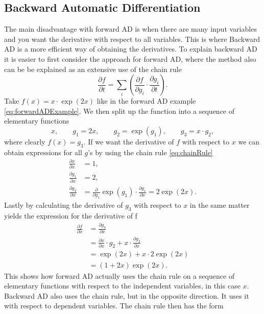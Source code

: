 \subsection{Backward Automatic Differentiation}
The main disadvantage with forward AD is when there are many input variables and you want the derivative with respect to all variables. This is where Backward AD is a more efficient way of obtaining the derivatives. To explain backward AD it is easier to first consider the approach for forward AD, where the method also can be be explained as an extensive use of the chain rule
\begin{equation}
    \label{eq:chainRule}
    \frac{\partial f}{\partial t} = \sum_i\left(\frac{\partial f}{\partial g_i}\cdot\frac{\partial g_i}{\partial t}\right).
\end{equation}
Take $f(x) = x\cdot\exp(2x)$ like in the forward AD example \eqref{eq:forwardADExample}. We then split up the function into a sequence of elementary functions
\begin{equation}
    \label{eq:BackwardADSeperationSimple}
    x, \hspace{2em} g_1 = 2x, \hspace{2em} g_2 = \exp(g_1), \hspace{2em} g_3 = x\cdot g_2,
\end{equation}
where clearly $f(x) = g_3$. If we want the derivative of $f$ with respect to $x$ we can obtain expressions for all $g$'s by using the chain rule \eqref{eq:chainRule}
\begin{align*}
     \frac{\partial x}{\partial x} &= 1, \\
     \frac{\partial g_1}{\partial x} &= 2, \\
     \frac{\partial g_2}{\partial x} &= \frac{\partial}{\partial g_1}\exp(g_1)\cdot\frac{\partial g_1}{\partial x} = 2\exp(2x).
\end{align*}
Lastly by calculating the derivative of $g_3$ with respect to $x$ in the same matter yields the expression for the derivative of f
\begin{align*}
    \frac{\partial f}{\partial x} &= \frac{\partial g_3}{\partial x}\\
    &=\frac{\partial x}{\partial x}\cdot g_2 + x\cdot\frac{\partial g_2}{\partial x}\\
    &= \exp(2x) + x\cdot 2\exp(2x) \\
    &= (1+2x)\exp(2x).
\end{align*}
This shows how forward AD actually uses the chain rule on a sequence of elementary functions with respect to the independent variables, in this case $x$. Backward AD also uses the chain rule, but in the opposite direction. It uses it with respect to dependent variables. The chain rule then has the form
